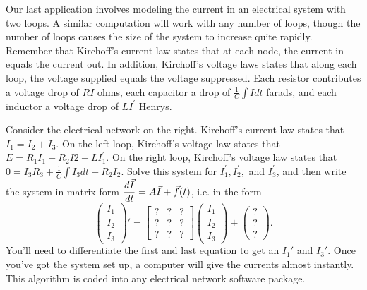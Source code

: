 Our last application involves modeling the current in an electrical system with two loops. A similar computation will work with any number of loops, though the number of loops causes the size of the system to increase quite rapidly.
Remember that Kirchoff's current law states that at each node, the current in equals the current out.  In addition, Kirchoff's voltage laws states that along each loop, the voltage supplied equals the voltage suppressed. Each resistor contributes a voltage drop of $RI$ ohms, each capacitor a drop of $\frac{1}{C}\int I dt$ farads, and each inductor a voltage drop of $LI^\prime$ Henrys.

\begin{problem}
\marginpar{}%
Consider the electrical network on the right.  
Kirchoff's current law states that $I_1=I_2+I_3$.  On the left loop, Kirchoff's voltage law states that $E = R_1I_1+R_2I2+LI_1^\prime$.  On the right loop, Kirchoff's voltage law states that $0=I_3R_3 +\frac{1}{C}\int I_3 dt - R_2I_2$.   Solve this system for $I_1^\prime, I_2^\prime,$ and $I_3^\prime$, and then write the system in matrix form $\displaystyle \frac{d\vec I}{dt} = A\vec I +\vec f(t)$, i.e. in the form 
$$
\begin{pmatrix}
 I_1\\I_2\\I_3
\end{pmatrix}'
=
\begin{bmatrix}
 ?&?&?\\
 ?&?&?\\
 ?&?&?
\end{bmatrix}
\begin{pmatrix}
 I_1\\I_2\\I_3
\end{pmatrix}
+
\begin{pmatrix}
 ?\\?\\?
\end{pmatrix}
.$$
You'll need to differentiate the first and last equation to get an $I_1'$ and $I_3'$.  Once you've got the system set up, a computer will give the currents almost instantly. This algorithm is coded into any electrical network software package.
\end{problem}
























